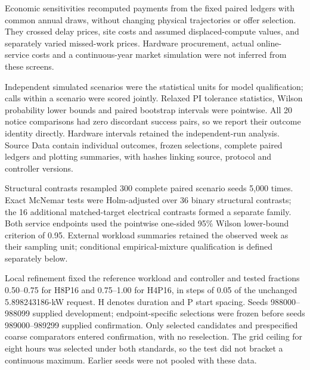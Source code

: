 \documentclass[10pt,a4paper]{article}
\begin{document}
Economic sensitivities recomputed payments from the fixed paired ledgers with common annual draws, without changing physical trajectories or offer selection. They crossed delay prices, site costs and assumed displaced-compute values, and separately varied missed-work prices. Hardware procurement, actual online-service costs and a continuous-year market simulation were not inferred from these screens.


Independent simulated scenarios were the statistical units for model qualification; calls within a scenario were scored jointly. Relaxed PI tolerance statistics, Wilson probability lower bounds and paired bootstrap intervals were pointwise. All 20 notice comparisons had zero discordant success pairs, so we report their outcome identity directly. Hardware intervals retained the independent-run analysis. Source Data contain individual outcomes, frozen selections, complete paired ledgers and plotting summaries, with hashes linking source, protocol and controller versions.


Structural contrasts resampled 300 complete paired scenario seeds 5,000 times. Exact McNemar tests were Holm-adjusted over 36 binary structural contrasts; the 16 additional matched-target electrical contrasts formed a separate family. Both service endpoints used the pointwise one-sided 95\% Wilson lower-bound criterion of 0.95. External workload summaries retained the observed week as their sampling unit; conditional empirical-mixture qualification is defined separately below.


Local refinement fixed the reference workload and controller and tested fractions 0.50–0.75 for H8P16 and 0.75–1.00 for H4P16, in steps of 0.05 of the unchanged 5.898243186-kW request. H denotes duration and P start spacing. Seeds 988000–988099 supplied development; endpoint-specific selections were frozen before seeds 989000–989299 supplied confirmation. Only selected candidates and prespecified coarse comparators entered confirmation, with no reselection. The grid ceiling for eight hours was selected under both standards, so the test did not bracket a continuous maximum. Earlier seeds were not pooled with these data.
\end{document}
